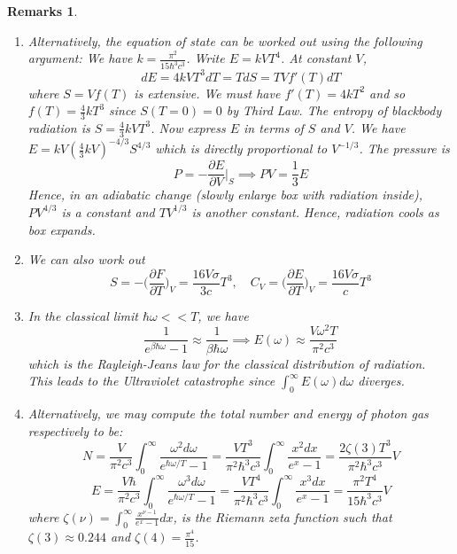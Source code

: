 \documentclass[a4paper]{article}
\newtheorem{remarks}{Remarks}[section]
\theoremstyle{new}
\begin{document}
\begin{remarks}\leavevmode
\begin{enumerate}
\item Alternatively, the equation of state can be worked out using the following argument: We have $k=\frac{\pi^2}{15\hbar^3c^3}$. Write $E=kVT^4$. At constant $V$,
$$dE=4kVT^3dT=TdS=TVf'(T)dT$$
where $S=Vf(T)$ is extensive. We must have $f'(T)=4kT^2$ and so $f(T)=\frac{4}{3}kT^3$ since $S(T=0)=0$ by Third Law. The entropy of blackbody radiation is $S=\frac{4}{3}kVT^3$. Now express $E$ in terms of $S$ and $V$. We have $E=kV(\frac{4}{3}kV)^{-4/3}S^{4/3}$ which is directly proportional to $V^{-1/3}$. The pressure is 
$$P=-\frac{\partial E}{\partial V}\bigg|_S\implies PV=\frac{1}{3}E$$
Hence, in an adiabatic change (slowly enlarge box with radiation inside), $PV^{4/3}$ is a constant and $TV^{1/3}$ is another constant. Hence, radiation cools as box expands.
\item We can also work out
$$S=-\bigg(\frac{\partial F}{\partial T}\bigg)_V=\frac{16V\sigma}{3c}T^3,\quad C_V=\bigg(\frac{\partial E}{\partial T}\bigg)_V=\frac{16V\sigma}{c}T^3$$
\item In the classical limit $\hbar\omega<<T$, we have
$$\frac{1}{e^{\beta\hbar\omega}-1}\approx\frac{1}{\beta\hbar\omega}\implies E(\omega)\approx\frac{V\omega^2T}{\pi^2c^3}$$
which is the Rayleigh-Jeans law for the classical distribution of radiation. This leads to the Ultraviolet catastrophe since $\int_0^\infty E(\omega)d\omega$ diverges.
\item Alternatively, we may compute the total number and energy of photon gas respectively to be:
$$N=\frac{V}{\pi^2c^3}\int_0^\infty\frac{\omega^2d\omega}{e^{\hbar\omega/T}-1}=\frac{VT^3}{\pi^2\hbar^3c^3}\int_0^\infty\frac{x^2dx}{e^x-1}=\frac{2\zeta(3)T^3}{\pi^2\hbar^3c^3}V$$
$$E=\frac{V\hbar}{\pi^2c^3}\int_0^\infty\frac{\omega^3d\omega}{e^{\hbar\omega/T}-1}=\frac{VT^4}{\pi^2\hbar^3c^3}\int_0^\infty\frac{x^3dx}{e^x-1}=\frac{\pi^2T^4}{15\hbar^3c^3}V$$
where $\zeta(\nu)=\int_0^\infty\frac{x^{\nu-1}}{e^x-1}dx$, is the Riemann zeta function such that $\zeta(3)\approx 0.244$ and $\zeta(4)=\frac{\pi^4}{15}$.
\end{enumerate}
\end{remarks}
\end{document}
